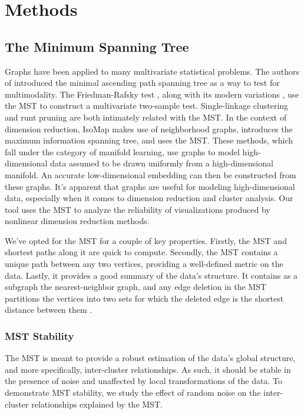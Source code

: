 \documentclass{article}
\begin{document}
\section{Methods}

\subsection{The Minimum Spanning Tree}
Graphs have been applied to many multivariate statistical problems. The authors of \cite{MAP test} introduced the minimal ascending path spanning tree as a way to test for multimodality. The Friedman-Rafsky test \cite{Friedman-Rafsky test}, along with its modern variations \cite{Friedman-Rafsky variation 1, Friedman-Rafsky variation 2, Friedman-Rafsky variation 3}, use the MST to construct a multivariate two-sample test. Single-linkage clustering \cite{single-linkage and MST} and runt pruning \cite{runt pruning} are both intimately related with the MST. In the context of dimension reduction, IsoMap \cite{IsoMap} makes use of neighborhood graphs, \cite{MIST example} introduces the maximum information spanning tree, and \cite{MST example} uses the MST. These methods, which fall under the category of manifold learning, use graphs to model high-dimensional data assumed to be drawn uniformly from a high-dimensional manifold. An accurate low-dimensional embedding can then be constructed from these graphs. It's apparent that graphs are useful for modeling high-dimensional data, especially when it comes to dimension reduction and cluster analysis. Our tool uses the MST to analyze the reliability of visualizations produced by nonlinear dimension reduction methods.

We've opted for the MST for a couple of key properties. Firstly, the MST and shortest paths along it are quick to compute. Secondly, the MST contains a unique path between any two vertices, providing a well-defined metric on the data. Lastly, it provides a good summary of the data's structure. It contains as a subgraph the nearest-neighbor graph, and any edge deletion in the MST partitions the vertices into two sets for which the deleted edge is the shortest distance between them \cite{Friedman-Rafsky test}.

\subsubsection{MST Stability}
The MST is meant to provide a robust estimation of the data's global structure, and more specifically, inter-cluster relationships. As such, it should be stable in the presence of noise and unaffected by local transformations of the data. To demonstrate MST stability, we study the effect of random noise on the inter-cluster relationships explained by the MST.
\end{document}
